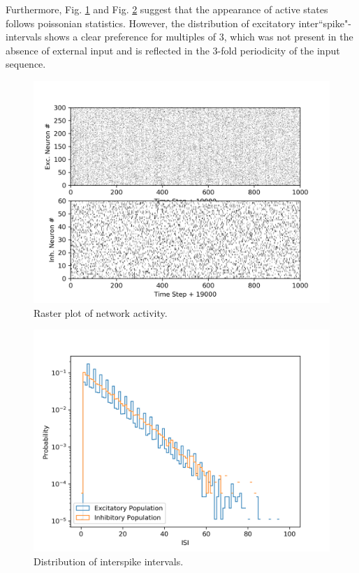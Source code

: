 \documentclass[10pt,a4paper]{article}
\begin{document}
Furthermore, Fig. \ref{fig:act_raster} and Fig. \ref{fig:isi_dist} suggest that the appearance of active states follows poissonian statistics. However, the distribution of excitatory inter``spike"-intervals shows a clear preference for multiples of 3, which was not present in the absence of external input and is reflected in the 3-fold periodicity of the input sequence. 

\begin{figure}
\includegraphics[width=\textwidth]{../plots/act_raster.png}
\caption{\label{fig:act_raster} Raster plot of network activity.}
\end{figure}

\begin{figure}
\includegraphics[width=\textwidth]{../plots/isi_dist.png}
\caption{\label{fig:isi_dist} Distribution of interspike intervals.}
\end{figure}
\end{document}
